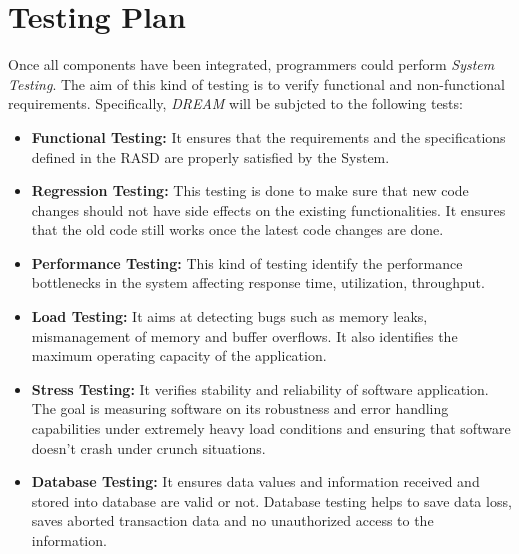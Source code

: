 \section{Testing Plan}

Once all components have been integrated, programmers could perform \textit{System Testing}.
The aim of this kind of testing is to verify functional and non-functional requirements.
Specifically, \textit{DREAM} will be subjcted to the following tests:

\begin{itemize}
    \item \textbf{Functional Testing:} It ensures that the requirements and the specifications defined in the RASD are properly satisfied by the System. 
    \item \textbf{Regression Testing:} This testing is done to make sure that new code changes should not have side effects on the existing functionalities. It ensures that the old code still works once the latest code changes are done.
    \item \textbf{Performance Testing:} This kind of testing identify the performance bottlenecks in the system affecting response time, utilization, throughput.
    \item \textbf{Load Testing:} It aims at detecting bugs such as memory leaks, mismanagement of memory and buffer overflows. It also identifies the maximum operating capacity of the application.
    \item \textbf{Stress Testing:} It verifies stability and reliability of software application. The goal is measuring software on its robustness and error handling capabilities under extremely heavy load conditions and ensuring that software doesn't crash under crunch situations.
    \item \textbf{Database Testing:} It ensures data values and information received and stored into database are valid or not. Database testing helps to save data loss, saves aborted transaction data and no unauthorized access to the information.
\end{itemize}